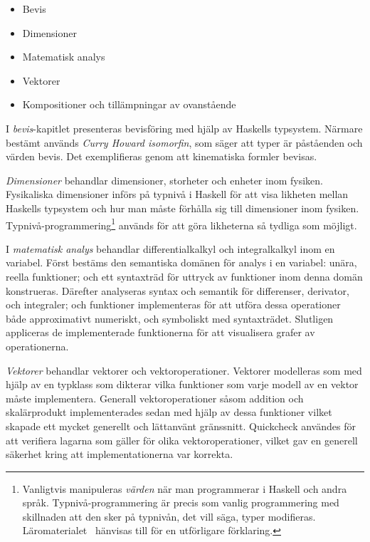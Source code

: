 \begin{draft}
\begin{itemize}
  \item Bevis
  \item Dimensioner
  \item Matematisk analys
  \item Vektorer
  \item Kompositioner och tillämpningar av ovanstående
\end{itemize}

I \textit{bevis}-kapitlet presenteras bevisföring med hjälp av Haskells
typsystem. Närmare bestämt används \textit{Curry Howard isomorfin}, som säger
att typer är påståenden och värden bevis.\cite{chi} Det exemplifieras genom att
kinematiska formler bevisas. 

\textit{Dimensioner} behandlar dimensioner, storheter och enheter inom fysiken.
Fysikaliska dimensioner införs på typnivå i Haskell för att visa likheten mellan
Haskells typsystem och hur man måste förhålla sig till dimensioner inom fysiken.
Typnivå-programmering\footnote{Vanligtvis manipuleras \textit{värden} när man
programmerar i Haskell och andra språk. Typnivå-programmering är precis som
vanlig programmering med skillnaden att den sker på typnivån, det vill säga,
typer modifieras. Läromaterialet~\cite{LYAP} hänvisas till för en utförligare
förklaring.} används för att göra likheterna så tydliga som möjligt.

I \textit{matematisk analys} behandlar differentialkalkyl och
integralkalkyl inom en variabel. Först bestäms den semantiska domänen
för analys i en variabel: unära, reella funktioner; och ett syntaxträd
för uttryck av funktioner inom denna domän konstrueras. Därefter
analyseras syntax och semantik för differenser, derivator, och
integraler; och funktioner implementeras för att utföra dessa
operationer både approximativt numeriskt, och symboliskt med
syntaxträdet. Slutligen appliceras de implementerade funktionerna för
att visualisera grafer av operationerna.

\textit{Vektorer} behandlar vektorer och vektoroperationer. Vektorer modelleras
som med hjälp av en typklass som dikterar vilka funktioner som varje
modell av en vektor måste implementera. Generall vektoroperationer såsom
addition och skalärprodukt implementerades sedan med hjälp av dessa funktioner
vilket skapade ett mycket generellt och lättanvänt gränssnitt. Quickcheck
användes för att verifiera lagarna som gäller för olika vektoroperationer,
vilket gav en generell säkerhet kring att implementationerna var korrekta.


\end{draft}
